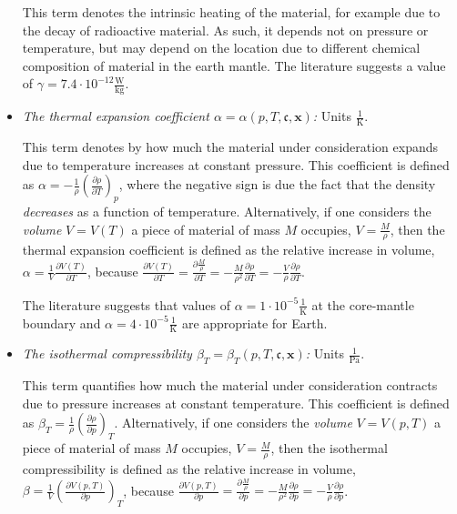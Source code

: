 \documentclass{article}
\begin{document}
\begin{itemize}
  This term denotes the intrinsic heating of the material, for example due to
  the decay of radioactive material. As such, it depends not on pressure or
  temperature, but may depend on the location due to different chemical
  composition of material in the earth mantle. The literature suggests a value
  of $\gamma=7.4\cdot 10^{-12}\frac{\textrm{W}}{\textrm{kg}}$.

\item \textit{The thermal expansion coefficient $\alpha=\alpha(p,T,\mathfrak c ,\mathbf x)$:} Units
  $\frac{1}{\textrm{K}}$.

  This term denotes by how much the material under consideration
  expands due to temperature increases at constant pressure.
  This coefficient is defined as
  $\alpha = -\frac{1}{\rho} \left(\frac{\partial \rho}{\partial T}\right)_{p}$,
  where the negative sign is due the fact that the density
  \textit{decreases} as a function of temperature. Alternatively, if
  one considers the \textit{volume} $V=V(T)$ a piece of material of mass $M$
  occupies, $V=\frac{M}{\rho}$, then the thermal expansion coefficient
  is defined as the relative increase in volume,
  $\alpha=\frac{1}{V}\frac{\partial V(T)}{\partial T}$, because 
  $\frac{\partial V(T)}{\partial T} =
   \frac{\partial \frac{M}{\rho}}{\partial T} =
   -\frac{M}{\rho^2} \frac{\partial \rho}{\partial T} =
   -\frac{V}{\rho} \frac{\partial \rho}{\partial T}$.

   The literature suggests that values of $\alpha=1\cdot
   10^{-5}\frac{1}{\textrm{K}}$ at the core-mantle boundary and $\alpha=4\cdot
   10^{-5}\frac{1}{\textrm{K}}$ are appropriate for Earth.

\item \textit{The isothermal compressibility $\beta_T=\beta_T(p,T,\mathfrak c ,\mathbf x)$:} Units
  $\frac{1}{\textrm{Pa}}$.

  This term quantifies how much the material under consideration
  contracts due to pressure increases at constant temperature.
  This coefficient is defined as
  $\beta_T = \frac{1}{\rho} \left( \frac{\partial \rho}{\partial p} \right)_{T}$.
  Alternatively, if
  one considers the \textit{volume} $V=V(p, T)$ a piece of material of mass $M$
  occupies, $V=\frac{M}{\rho}$, then the isothermal compressibility
  is defined as the relative increase in volume,
  $\beta=\frac{1}{V}\left(\frac{\partial V(p, T)}{\partial p}\right)_{T}$, because 
  $\frac{\partial V(p, T)}{\partial p} =
   \frac{\partial \frac{M}{\rho}}{\partial p} =
   -\frac{M}{\rho^2} \frac{\partial \rho}{\partial p} =
   -\frac{V}{\rho} \frac{\partial \rho}{\partial p}$.


\end{itemize}
\end{document}
